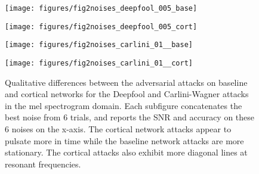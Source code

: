 \documentclass{article}
\begin{document}
\begin{figure}[t!]
	
	\begin{minipage}[b]{.24\linewidth}
		\centering
		\centerline{\texttt{[image: figures/fig2noises\_deepfool\_005\_base]}}
	\end{minipage}
	\hfill
	\begin{minipage}[b]{0.24\linewidth}
		\centering
		\centerline{\texttt{[image: figures/fig2noises\_deepfool\_005\_cort]}}
	\end{minipage}
	\hfill
	\begin{minipage}[b]{0.24\linewidth}
		\centering
		\centerline{\texttt{[image: figures/fig2noises\_carlini\_01\_\_base]}}
	\end{minipage}
	\hfill
	\begin{minipage}[b]{0.24\linewidth}
		\centering
		\centerline{\texttt{[image: figures/fig2noises\_carlini\_01\_\_cort]}}
	\end{minipage}
	
	\caption{Qualitative differences between the adversarial attacks on baseline and cortical networks for the Deepfool and Carlini-Wagner attacks in the mel spectrogram domain. Each subfigure concatenates the best noise from 6 trials, and reports the SNR and accuracy on these 6 noises on the x-axis. The cortical network attacks appear to pulsate more in time while the baseline network attacks are more stationary. The cortical attacks also exhibit more diagonal lines at resonant frequencies.}
	\label{fig:qual2}
\end{figure}

\begin{comment}
\medskip
\noindent
{\bf The word extraction algorithm.}
To extract words from audio in an unsupervised method on Librispeech we used the following algorithm.
Original audio was filtered for speech base frequencies $85-255$ Hz and normalized, then the energy of this signal was convolved with a 100ms Hann window at 25ms hop, giving an envelope for the signal's energy . Local min/max extrema were found, and segments were marked around triplets of low-high-low extrema points. Neighboring segments were joined if less than 350ms, and segments longer than 1.2s were discarded. Then words segments were sorted by the quietest silences preceding and following the word, and were extracted from the original unmodified audio.
\end{comment}
\end{document}
